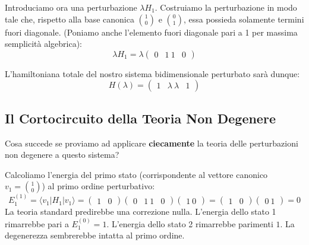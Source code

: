 Introduciamo ora una perturbazione $\lambda H_1$. Costruiamo la perturbazione in modo tale che, rispetto alla base canonica $\binom{1}{0}$ e $\binom{0}{1}$, essa possieda solamente termini fuori diagonale. (Poniamo anche l'elemento fuori diagonale pari a 1 per massima semplicità algebrica):
\begin{equation}
\lambda H_1 = \lambda \begin{pmatrix} 0 & 1 \ 1 & 0 \end{pmatrix}
\end{equation}

L'hamiltoniana totale del nostro sistema bidimensionale perturbato sarà dunque:
\begin{equation}
H(\lambda) = \begin{pmatrix} 1 & \lambda \ \lambda & 1 \end{pmatrix}
\end{equation}

\subsection{Il Cortocircuito della Teoria Non Degenere}
Cosa succede se proviamo ad applicare \textbf{ciecamente} la teoria delle perturbazioni non degenere a questo sistema?

Calcoliamo l'energia del primo stato (corrispondente al vettore canonico $v_1 = \binom{1}{0}$) al primo ordine perturbativo:
\begin{equation}
E_1^{(1)} = \langle v_1 | H_1 | v_1 \rangle = \begin{pmatrix} 1 & 0 \end{pmatrix} \begin{pmatrix} 0 & 1 \ 1 & 0 \end{pmatrix} \begin{pmatrix} 1 \ 0 \end{pmatrix} = \begin{pmatrix} 1 & 0 \end{pmatrix} \begin{pmatrix} 0 \ 1 \end{pmatrix} = 0
\end{equation}
La teoria standard predirebbe una correzione nulla. L'energia dello stato 1 rimarrebbe pari a $E_1^{(0)} = 1$. L'energia dello stato 2 rimarrebbe parimenti $1$. La degenerezza sembrerebbe intatta al primo ordine.


